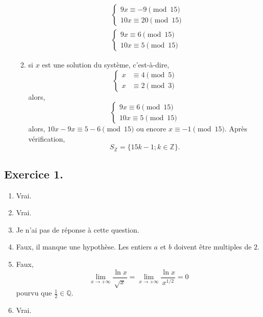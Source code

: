 \documentclass{article}
\begin{document}
\begin{enumerate}
\begin{enumerate}[label=(\alph*)]
\begin{align*}
			&\begin{cases}
			9x \equiv -9\pmod{15}\\
			10x \equiv 20\pmod{15}
		\end{cases}\\
		&\begin{cases}
		9x \equiv 6\pmod{15}\\
		10x \equiv 5\pmod{15}
		\end{cases}
		\end{align*}
		\item si $x$ est une solution du système, c'est-à-dire, $$\begin{cases}
		x &\equiv4 \pmod5\\
		x &\equiv2 \pmod3
		\end{cases}$$
		alors,
		$$\begin{cases}
		9x \equiv 6\pmod{15}\\
		10x \equiv 5\pmod{15}\end{cases}$$
		alors, $10x-9x\equiv5-6\pmod{15}$ ou encore $x\equiv-1\pmod{15}$. Après vérification,
		$$S_{\mathbb{Z}}=\{15k-1; k\in\mathbb{Z}\}.$$
	\end{enumerate}
	\end{enumerate}
\subsection*{Exercice 1.}
\begin{enumerate}
	\item Vrai.
	\item Vrai.
	\item Je n'ai pas de réponse à cette question.
	\item Faux, il manque une hypothèse. Les entiers $a$ et $b$ doivent être multiples de $2$.
	\item Faux, $$\lim_{x\to+\infty}\frac{\ln x}{\sqrt{x}}=\lim_{x\to+\infty}\frac{\ln x}{x^{1/2}}=0$$ pourvu que $\frac{1}{2}\in\mathbb{Q}$.
	\item Vrai.
\end{enumerate}
\end{document}
